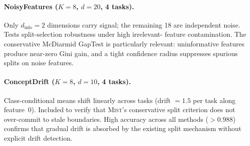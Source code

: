 \documentclass{article}
\newcommand{\mist}{\textsc{Mist}}
\begin{document}
\paragraph{NoisyFeatures ($K{=}8$, $d{=}20$, 4 tasks).}
Only $d_{\mathrm{info}}{=}2$ dimensions carry signal; the remaining 18 are
independent noise. Tests split-selection robustness under high irrelevant-
feature contamination. The conservative McDiarmid GapTest is particularly
relevant: uninformative features produce near-zero Gini gain, and a tight
confidence radius suppresses spurious splits on noise features.

\paragraph{ConceptDrift ($K{=}8$, $d{=}10$, 4 tasks).}
Class-conditional means shift linearly across tasks (drift $= 1.5$ per task
along feature~0). Included to verify that \mist{}'s conservative split
criterion does not over-commit to stale boundaries. High accuracy across all
methods ($> 0.988$) confirms that gradual drift is absorbed by the existing
split mechanism without explicit drift detection.
\end{document}
